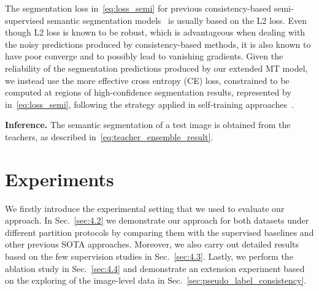 \documentclass[10pt,twocolumn,letterpaper]{article}
\begin{document}
The segmentation loss  in~\eqref{eq:loss_semi} for previous consistency-based semi-supervised semantic segmentation models~\cite{french2019semi, chen2021semi}
is usually based on the L2 loss. 
Even though L2 loss is known to be robust, which is advantageous when dealing with the noisy predictions produced by consistency-based methods, it is also known to have poor converge and to possibly lead to vanishing gradients. 
Given the reliability of the segmentation predictions produced by our extended MT model, we instead use the more effective cross entropy (CE) loss, constrained to be computed at regions of high-confidence segmentation results, represented by  in~\eqref{eq:loss_semi}, following the strategy applied in self-training approaches~\cite{yuan2021simple, he2021re, yang2021st++}. 
























\textbf{Inference.} The semantic segmentation of a test image is obtained from the teachers, as described in~\eqref{eq:teacher_ensemble_result}. 

































\section{Experiments}
We firstly introduce the experimental setting that we used to evaluate our approach. In Sec.~\ref{sec:4.2} we demonstrate our approach for both datasets under different partition protocols by comparing them with the supervised baselines and other previous SOTA approaches. Moreover, we also carry out detailed results based on the few supervision studies in Sec.~\ref{sec:4.3}. Lastly, we perform the ablation study in Sec.~\ref{sec:4.4} and demonstrate an extension experiment based on the exploring of the image-level data in Sec.~\ref{sec:pseudo_label_consistency}.
\end{document}
